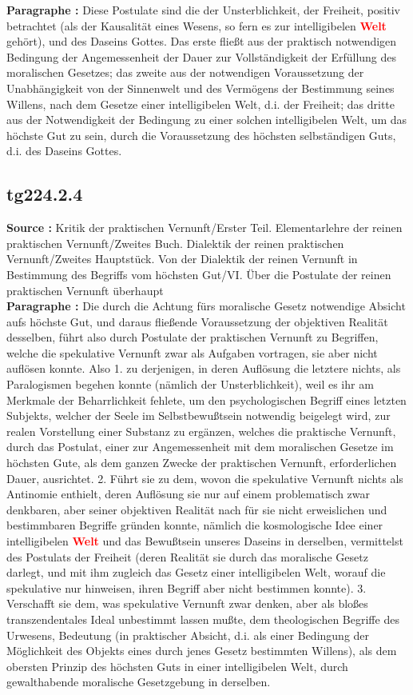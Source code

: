 \documentclass[a4paper,12pt,twoside]{book}
\newcommand{\match}[1]{\textcolor{red}{\textbf{#1}}}
\begin{document}
	\noindent\textbf{Paragraphe : }Diese Postulate sind die der Unsterblichkeit, der Freiheit, positiv betrachtet (als der Kausalität eines Wesens, so fern es zur intelligibelen \match{Welt} gehört), und des Daseins Gottes. Das erste fließt aus der praktisch notwendigen Bedingung der Angemessenheit der Dauer zur Vollständigkeit der Erfüllung des moralischen Gesetzes; das zweite aus der notwendigen Voraussetzung der Unabhängigkeit von der Sinnenwelt und des Vermögens der Bestimmung seines Willens, nach dem Gesetze einer intelligibelen Welt, d.i. der Freiheit; das dritte aus der Notwendigkeit der Bedingung zu einer solchen intelligibelen Welt, um das höchste Gut zu sein, durch die Voraussetzung des höchsten selbständigen Guts, d.i. des Daseins Gottes. 
	
	\subsection*{tg224.2.4} 
	\textbf{Source : }Kritik der praktischen Vernunft/Erster Teil. Elementarlehre der reinen praktischen Vernunft/Zweites Buch. Dialektik der reinen praktischen Vernunft/Zweites Hauptstück. Von der Dialektik der reinen Vernunft in Bestimmung des Begriffs vom höchsten Gut/VI. Über die Postulate der reinen praktischen Vernunft überhaupt\\  
	
	\noindent\textbf{Paragraphe : }
	Die durch die Achtung fürs moralische Gesetz notwendige Absicht aufs höchste Gut, und daraus fließende Voraussetzung der objektiven Realität desselben, führt also durch Postulate der praktischen Vernunft zu Begriffen, welche die spekulative Vernunft zwar als Aufgaben vortragen, sie aber nicht auflösen konnte. Also 1. zu derjenigen, in deren Auflösung die letztere nichts, als Paralogismen begehen konnte (nämlich der Unsterblichkeit), weil es ihr am Merkmale der Beharrlichkeit fehlete, um den psychologischen Begriff eines letzten Subjekts, welcher der Seele im Selbstbewußtsein notwendig beigelegt wird, zur realen Vorstellung einer Substanz zu ergänzen, welches die praktische Vernunft, durch das Postulat, einer zur Angemessenheit mit dem moralischen Gesetze im höchsten Gute, als dem ganzen Zwecke der praktischen Vernunft, erforderlichen Dauer, ausrichtet. 2. Führt sie zu dem, wovon die spekulative Vernunft nichts als Antinomie enthielt, deren Auflösung sie nur auf einem problematisch zwar denkbaren, aber seiner objektiven Realität nach für sie nicht erweislichen und bestimmbaren Begriffe gründen konnte, nämlich die kosmologische Idee einer intelligibelen \match{Welt} und das Bewußtsein unseres Daseins in derselben, vermittelst des Postulats der Freiheit (deren Realität sie durch das moralische Gesetz darlegt, und mit ihm zugleich das Gesetz einer intelligibelen Welt, worauf die spekulative nur hinweisen, ihren Begriff aber nicht bestimmen konnte). 3. Verschafft sie dem, was spekulative Vernunft zwar denken, aber als bloßes transzendentales Ideal unbestimmt lassen mußte, dem theologischen Begriffe des Urwesens, Bedeutung (in praktischer Absicht, d.i. als einer Bedingung der Möglichkeit des Objekts eines durch jenes Gesetz bestimmten Willens), als dem obersten Prinzip des höchsten Guts in einer intelligibelen Welt, durch gewalthabende moralische Gesetzgebung in derselben. 
	
\end{document}

